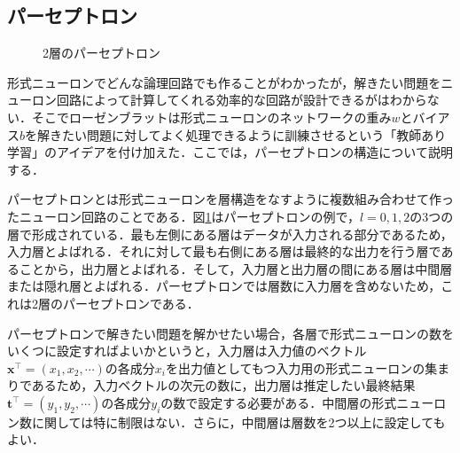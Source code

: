 \documentclass[a4paper,11pt]{jsreport}
\begin{document}
\subsection{パーセプトロン}
\begin{figure}[H]
  \begin{center}
    \centering
    \caption{2層のパーセプトロン}
    \label{2層パーセプトロン}
  \end{center}
\end{figure}
形式ニューロンでどんな論理回路でも作ることがわかったが，解きたい問題をニューロン回路によって計算してくれる効率的な回路が設計できるがはわからない．そこでローゼンブラットは形式ニューロンのネットワークの重み$w$とバイアス$b$を解きたい問題に対してよく処理できるように訓練させるという「教師あり学習」のアイデアを付け加えた．ここでは，パーセプトロンの構造について説明する．\par
パーセプトロンとは形式ニューロンを層構造をなすように複数組み合わせて作ったニューロン回路のことである．図\ref{2層パーセプトロン}はパーセプトロンの例で，$l=0,1,2$の3つの層で形成されている．最も左側にある層はデータが入力される部分であるため，入力層とよばれる．それに対して最も右側にある層は最終的な出力を行う層であることから，出力層とよばれる．そして，入力層と出力層の間にある層は中間層または隠れ層とよばれる．パーセプトロンでは層数に入力層を含めないため，これは2層のパーセプトロンである．\par
パーセプトロンで解きたい問題を解かせたい場合，各層で形式ニューロンの数をいくつに設定すればよいかというと，入力層は入力値のベクトル$\bm{x}^{\top}=(x_1, x_2, \cdots)$の各成分$x_i$を出力値としてもつ入力用の形式ニューロンの集まりであるため，入力ベクトルの次元の数に，出力層は推定したい最終結果$\bm{t}^{\top}=(y_1, y_2, \cdots)$の各成分$y_i$の数で設定する必要がある．中間層の形式ニューロン数に関しては特に制限はない．さらに，中間層は層数を2つ以上に設定してもよい．
\end{document}
